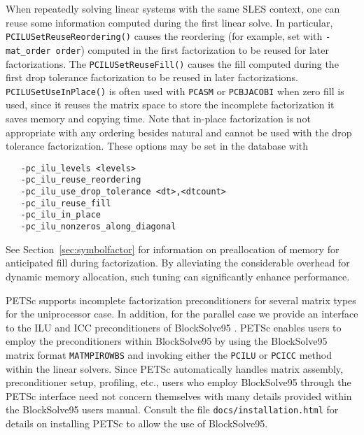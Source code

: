 When repeatedly solving linear systems with the same SLES
context, one can reuse some information  computed
during the first linear solve.
In particular, {\tt PCILUSetReuseReordering()} causes the reordering  (for example, set with 
{\tt -mat\_order order}) computed in the first factorization to be reused
for later factorizations.  
The {\tt  PCILUSetReuseFill()} causes the 
fill computed during the first drop tolerance factorization to be reused
in later factorizations. {\tt PCILUSetUseInPlace()} is often used with 
{\tt PCASM} or {\tt PCBJACOBI} when zero fill is used, since it reuses the 
matrix space to store the incomplete factorization it saves memory and 
copying time. Note that in-place factorization is not appropriate with 
any ordering besides natural and cannot be used with the drop tolerance
factorization. These options may be set in the database with 
\begin{verbatim}
   -pc_ilu_levels <levels>
   -pc_ilu_reuse_reordering
   -pc_ilu_use_drop_tolerance <dt>,<dtcount>
   -pc_ilu_reuse_fill
   -pc_ilu_in_place
   -pc_ilu_nonzeros_along_diagonal
\end{verbatim}
 
 
 

See Section~\ref{sec:symbolfactor} for information on preallocation
of memory for anticipated fill during factorization.
By alleviating the considerable overhead for dynamic memory allocation,
such tuning can significantly enhance performance.

PETSc supports incomplete factorization preconditioners for several matrix
types for the uniprocessor case.  
 In addition, for the parallel case
we provide an interface to the ILU and ICC preconditioners
of BlockSolve95 \cite{bs-user-ref}.   PETSc enables users
to employ the preconditioners within
BlockSolve95 by using the BlockSolve95 matrix format {\tt MATMPIROWBS}
and invoking either the {\tt PCILU} or {\tt PCICC} method within the linear
solvers.  Since PETSc automatically handles matrix assembly,
preconditioner setup, profiling, etc., users who employ BlockSolve95
through the PETSc interface need not concern themselves with many
details provided within the BlockSolve95 users manual. Consult the file
{\tt docs/installation.html} for details on installing PETSc to allow 
the use of BlockSolve95.

